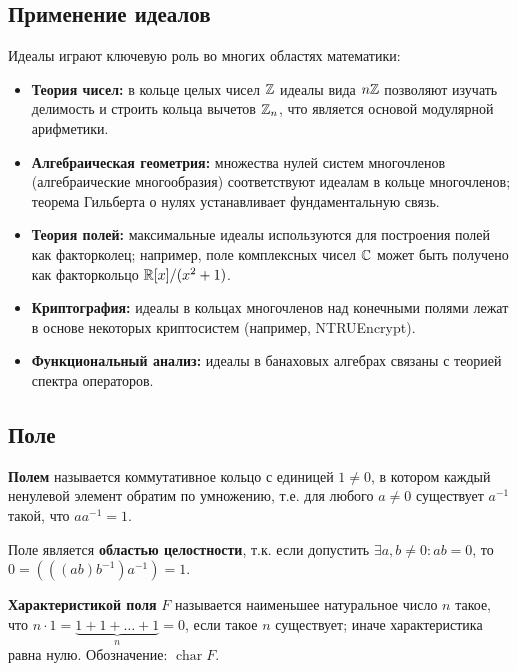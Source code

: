 \documentclass[10pt]{article}
\begin{document}
\subsection*{Применение идеалов}
Идеалы играют ключевую роль во многих областях математики:
\begin{itemize}
    \item \textbf{Теория чисел:} в кольце целых чисел $\mathbb{Z}$ идеалы вида $n\mathbb{Z}$ позволяют изучать делимость и строить кольца вычетов $\mathbb{Z}_n$, что является основой модулярной арифметики.
    \item \textbf{Алгебраическая геометрия:} множества нулей систем многочленов (алгебраические многообразия) соответствуют идеалам в кольце многочленов; теорема Гильберта о нулях устанавливает фундаментальную связь.
    \item \textbf{Теория полей:} максимальные идеалы используются для построения полей как факторколец; например, поле комплексных чисел $\mathbb{C}$ может быть получено как факторкольцо $\mathbb{R}[x]/(x^2+1)$.
    \item \textbf{Криптография:} идеалы в кольцах многочленов над конечными полями лежат в основе некоторых криптосистем (например, NTRUEncrypt).
    \item \textbf{Функциональный анализ:} идеалы в банаховых алгебрах связаны с теорией спектра операторов.
\end{itemize}

\subsection{Поле}
\begin{definition}
\textbf{Полем} называется коммутативное кольцо с единицей $1 \neq 0$, в котором каждый ненулевой элемент обратим по умножению, т.е. для любого $a \neq 0$ существует $a^{-1}$ такой, что $a a^{-1} = 1$.
\end{definition}

\begin{definition}
    Поле является \textbf{областью целостности}, т.к. если допустить
    \(\exists a, b \neq 0 : ab = 0\), то \(0 = (((ab)b^{-1})a^{-1}) = 1\).
\end{definition}

\begin{definition}
\textbf{Характеристикой поля} $F$ называется наименьшее натуральное число $n$ такое, что $n \cdot 1 = \underbrace{1+1+\dots+1}_{n} = 0$, если такое $n$ существует; иначе характеристика равна нулю. Обозначение: $\operatorname{char} F$.
\end{definition}
\end{document}
